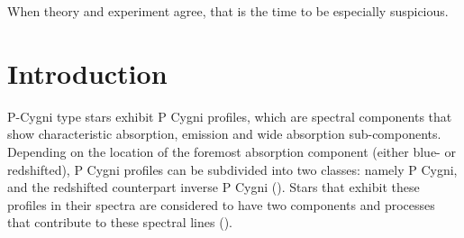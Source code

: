 \begin{savequote}[45mm]
When theory and experiment agree, 
that is the time to be especially suspicious. 
\end{savequote}

\chapter{Introduction}


P-Cygni type stars exhibit P Cygni profiles, which are spectral components that show characteristic absorption, emission and wide absorption sub-components. Depending on the location of the foremost absorption component (either blue- or redshifted), P Cygni profiles can be subdivided into two classes: namely P Cygni, and the  redshifted counterpart inverse P Cygni (). Stars that exhibit these profiles in their spectra are considered to have two components and processes that contribute to these spectral lines (\cite{zhang2021catalog}). \cite{1953PDAO....9....1B}

